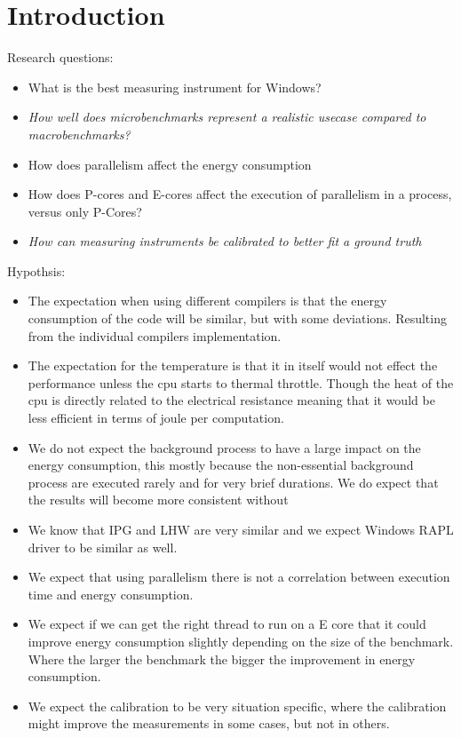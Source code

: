 \section{Introduction}

Research questions:

\begin{itemize}
    \item What is the best measuring instrument for Windows? %
    \item \textit{How well does microbenchmarks represent a realistic usecase compared to macrobenchmarks?}
    \item How does parallelism affect the energy consumption
    \item How does P-cores and E-cores affect the execution of parallelism in a process, versus only P-Cores?
    \item \textit{How can measuring instruments be calibrated to better fit a ground truth}
\end{itemize}


Hypothsis:

\begin{itemize}
    \item The expectation when using different compilers is that the energy consumption of the code will be similar, but with some deviations. Resulting from the individual compilers implementation.
    \item The expectation for the temperature is that it in itself would not effect the performance unless the cpu starts to thermal throttle. Though the heat of the cpu is directly related to the electrical resistance meaning that it would be less efficient in terms of joule per computation.
    \item We do not expect the background process to have a large impact on the energy consumption, this mostly because the non-essential background process are executed rarely and for very brief durations. We do expect that the results will become more consistent without 
    \item We know that IPG and LHW are very similar and we expect Windows RAPL driver to be similar as well.
    \item We expect that using parallelism there is not a correlation between execution time and energy consumption.
    \item We expect if we can get the right thread to run on a E core that it could improve energy consumption slightly depending on the size of the benchmark. Where the larger the benchmark the bigger the improvement in energy consumption. %
    \item We expect the calibration to be very situation specific, where the calibration might improve the measurements in some cases, but not in others.
\end{itemize}